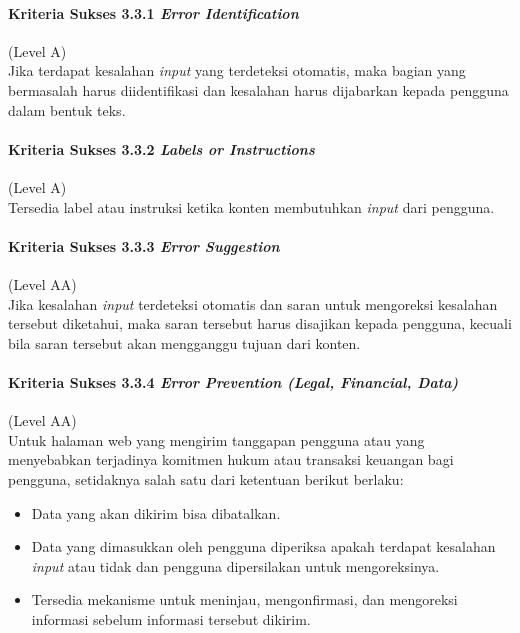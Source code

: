 \paragraph{Kriteria Sukses 3.3.1 \textit{Error Identification}}
\label{sec:kriteria_sukses_3.3.1}
(Level A)\\

Jika terdapat kesalahan \textit{input} yang terdeteksi otomatis, maka bagian yang bermasalah harus diidentifikasi dan kesalahan harus dijabarkan kepada pengguna dalam bentuk teks.

\paragraph{Kriteria Sukses 3.3.2 \textit{Labels or Instructions}}
\label{sec:kriteria_sukses_3.3.2}
(Level A)\\

Tersedia label atau instruksi ketika konten membutuhkan \textit{input} dari pengguna.

\paragraph{Kriteria Sukses 3.3.3 \textit{Error Suggestion}}
\label{sec:kriteria_sukses_3.3.3}
(Level AA)\\

Jika kesalahan \textit{input} terdeteksi otomatis dan saran untuk mengoreksi kesalahan tersebut diketahui, maka saran tersebut harus disajikan kepada pengguna, kecuali bila saran tersebut akan mengganggu tujuan dari konten.

\paragraph{Kriteria Sukses 3.3.4 \textit{Error Prevention (Legal, Financial, Data)}}
\label{sec:kriteria_sukses_3.3.4}
(Level AA)\\

Untuk halaman web yang mengirim tanggapan pengguna atau yang menyebabkan terjadinya komitmen hukum atau transaksi keuangan bagi pengguna, setidaknya salah satu dari ketentuan berikut berlaku:
\begin{itemize}
	\item Data yang akan dikirim bisa dibatalkan.
	\item Data yang dimasukkan oleh pengguna diperiksa apakah terdapat kesalahan \textit{input} atau tidak dan pengguna dipersilakan untuk mengoreksinya.
	\item Tersedia mekanisme untuk meninjau, mengonfirmasi, dan mengoreksi informasi sebelum informasi tersebut dikirim.
\end{itemize}

